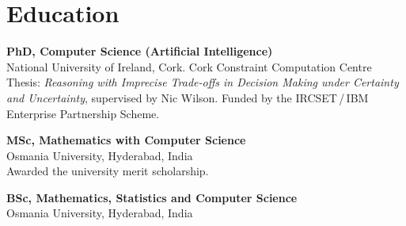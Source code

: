 \documentclass[9pt,letterpaper]{extarticle}
\newlength{\gutter}\setlength{\gutter}{0.78in}
\newenvironment{dated}[1][4pt]
  {\begin{list}{}{%
      \setlength{\labelwidth}{\gutter}
      \setlength{\labelsep}{0.16in}
      \setlength{\leftmargin}{\dimexpr\gutter+0.16in\relax}
      \setlength{\itemsep}{#1}
      \setlength{\parsep}{0pt}
      \setlength{\topsep}{3pt}
      \renewcommand{\makelabel}[1]{\raggedright\small\color{soft}##1\hfill}}}
  {\end{list}}
\newcommand{\role}[2]{{\normalsize\bfseries #1}\\[1.5pt]{\color{accent}#2}}
\begin{document}
\section{Education}
\begin{dated}
  \item[2010--2014]
    \role{PhD, Computer Science (Artificial Intelligence)}
         {National University of Ireland, Cork. Cork Constraint Computation Centre}\\[1.5pt]
    Thesis: \textit{Reasoning with Imprecise Trade-offs in Decision Making under Certainty and
    Uncertainty}, supervised by Nic Wilson. Funded by the IRCSET\,/\,IBM Enterprise Partnership Scheme.
  \item[2003--2005]
    \role{MSc, Mathematics with Computer Science}{Osmania University, Hyderabad, India}\\[1.5pt]
    Awarded the university merit scholarship.
  \item[2000--2003]
    \role{BSc, Mathematics, Statistics and Computer Science}{Osmania University, Hyderabad, India}
\end{dated}

\end{document}
